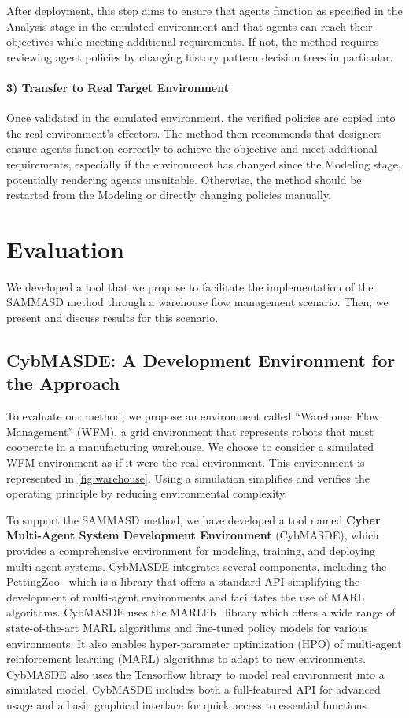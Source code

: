 \documentclass[sigconf,anonymous]{aamas}
\begin{document}
After deployment, this step aims to ensure that agents function as specified in the Analysis stage in the emulated environment and that agents can reach their objectives while meeting additional requirements. If not, the method requires reviewing agent policies by changing history pattern decision trees in particular.

\paragraph{\textbf{3) Transfer to Real Target Environment}}

Once validated in the emulated environment, the verified policies are copied into the real environment's effectors. The method then recommends that designers ensure agents function correctly to achieve the objective and meet additional requirements, especially if the environment has changed since the Modeling stage, potentially rendering agents unsuitable. Otherwise, the method should be restarted from the Modeling or directly changing policies manually.

\section{Evaluation}
\label{sec:evaluation}

We developed a tool that we propose to facilitate the implementation of the SAMMASD method through a warehouse flow management scenario. Then, we present and discuss results for this scenario.

\subsection{CybMASDE: A Development Environment for the Approach}

To evaluate our method, we propose an environment called “Warehouse Flow Management” (WFM), a grid environment that represents robots that must cooperate in a manufacturing warehouse. We choose to consider a simulated WFM environment as if it were the real environment. This environment is represented in \autoref{fig:warehouse}.
Using a simulation simplifies and verifies the operating principle by reducing environmental complexity.

To support the SAMMASD method, we have developed a tool named \textbf{Cyber Multi-Agent System Development Environment} (CybMASDE), which provides a comprehensive environment for modeling, training, and deploying multi-agent systems. CybMASDE integrates several components, including the PettingZoo~\cite{Terry2021} which is a library that offers a standard API simplifying the development of multi-agent environments and facilitates the use of MARL algorithms. CybMASDE uses the MARLlib~\cite{hu2022marllib} library which offers a wide range of state-of-the-art MARL algorithms and fine-tuned policy models for various environments. It also enables hyper-parameter optimization (HPO) of multi-agent reinforcement learning (MARL) algorithms to adapt to new environments. CybMASDE also uses the Tensorflow library to model real environment into a simulated model. CybMASDE includes both a full-featured API for advanced usage and a basic graphical interface for quick access to essential functions.
\end{document}
